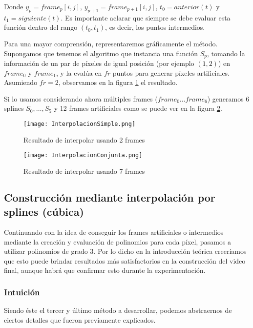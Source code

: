 Donde $y_{p} = frame_p[i,j]$, $y_{p+1} = frame_{p+1}[i,j]$, $t_0=anterior(t)$ y $t_1=siguiente(t)$. Es importante aclarar que siempre se debe evaluar esta funci\'on dentro del rango $(t_0, t_1)$, es decir, los puntos intermedios.

Para una mayor comprensi\'on, representaremos gr\'aficamente el método. Supongamos que tenemos el algoritmo que instancia una funci\'on $S_{p}$, tomando la información de un par de p\'ixeles de igual posici\'on (por ejemplo $(1,2)$) en $frame_0$ y $frame_1$, y la evalúa en $fr$ puntos para generar píxeles artificiales. Asumiendo $fr = 2$, observamos en la figura \ref{fig:intSimple} el resultado.

Si lo usamos considerando ahora múltiples frames ($frame_0 \ldots frame_6$) generamos 6 splines $S_0, \ldots, S_5$ y 12 frames artificiales como se puede ver en la figura \ref{fig:intConjunta}.

\begin{figure}[h!]
  \centering
    \texttt{[image: InterpolacionSimple.png]}
     \caption{Resultado de interpolar usando 2 frames}\label{fig:intSimple}
\end{figure}
\noindent

\begin{figure}[h!]
  \centering
    \texttt{[image: InterpolacionConjunta.png]}
     \caption{Resultado de interpolar usando 7 frames}\label{fig:intConjunta}
\end{figure}
\noindent

\subsection{Construcción mediante interpolación por splines (c\'ubica)}

Continuando con la idea de conseguir los frames artificiales o intermedios mediante la creación y evaluación de polinomios para cada píxel, pasamos a utilizar polinomios de grado 3. Por lo dicho en la introducción teórica creeríamos que esto puede brindar resultados m\'as satisfactorios en la construcci\'on del video final, aunque habr\'a que confirmar esto durante la experimentaci\'on.

\subsubsection*{\bf{Intuición}}

Siendo \'este el tercer y \'ultimo m\'etodo a desarrollar, podemos abstraernos de ciertos detalles que fueron previamente explicados.

